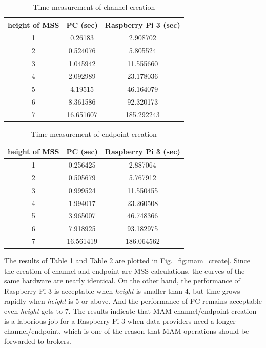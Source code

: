 \documentclass[conference]{IEEEtran}
\begin{document}
\begin{table}[htbp]
	\caption{Time measurement of channel creation}
	\label{tab:channel_create}
	\begin{center}
	\begin{tabular}{|c|c|c|}
	\hline
		\textbf{height of MSS} & \textbf{PC (sec)} & \textbf{Raspberry Pi 3 (sec)} \\ 
		\hline
		1 & 0.26183 & 2.908702 \\ 
		2 & 0.524076 & 5.805524 \\ 
		3 & 1.045942 & 11.555660 \\ 
		4 & 2.092989 & 23.178036 \\ 
		5 & 4.19515 & 46.164079\\ 
		6 & 8.361586 & 92.320173\\ 
		7 & 16.651607 & 185.292243\\
		\hline
	\end{tabular}
	\end{center}
\end{table}

\begin{table}[htbp]
	\caption{Time measurement of endpoint creation}
	\label{tab:endpoint_create}
	\begin{center}
	\begin{tabular}{|c|c|c|}
	\hline
		\textbf{height of MSS} & \textbf{PC (sec)} & \textbf{Raspberry Pi 3 (sec)} \\ 
		\hline
		1 & 0.256425 & 2.887064 \\ 
		2 & 0.505679 & 5.767912 \\ 
		3 & 0.999524 & 11.550455 \\ 
		4 & 1.994017 & 23.260508 \\ 
		5 & 3.965007 & 46.748366 \\ 
		6 & 7.918925 & 93.182975 \\ 
		7 & 16.561419 & 186.064562 \\
		\hline
	\end{tabular}
	\end{center}
\end{table}

The results of Table \ref{tab:channel_create} and Table \ref{tab:endpoint_create} are plotted in Fig.~\ref{fig:mam_create}. Since the creation of channel and endpoint are MSS calculations, the curves of the same hardware are nearly identical. On the other hand, the performance of Raspberry Pi 3 is acceptable when \textit{height} is smaller than 4, but time grows rapidly when \textit{height} is 5 or above. And the performance of PC remains acceptable even \textit{height} gets to 7. The results indicate that MAM channel/endpoint creation is a laborious job for a Raspberry Pi 3 when data providers need a longer channel/endpoint, which is one of the reason that MAM operations should be forwarded to brokers.
  
\end{document}
